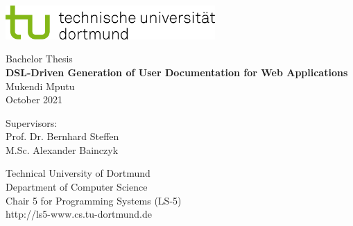 \begin{titlepage}
\vspace*{-2cm}
\newlength{\links}
\setlength{\links}{-1.5cm}
\sffamily
\hspace*{\links}
\begin{minipage}{12.5cm}
\includegraphics[width=8cm]{bilder/tud_logo_rgb}
\end{minipage}

\vspace*{4cm}

\hspace*{\links}
\hspace*{-0.2cm}
\begin{minipage}{9cm}
\large
\begin{center}
{\Large Bachelor Thesis} \\
\vspace*{1cm}
\textbf{DSL-Driven Generation of User Documentation for Web Applications} \\
\vspace*{1cm}
Mukendi Mputu\\
October 2021
\end{center}
\end{minipage}
\normalsize
\vspace*{5.5cm}


\vspace*{2.1cm}

\hspace*{\links}
\begin{minipage}[b]{5cm}
\raggedright
Supervisors:\\
Prof. Dr. Bernhard Steffen\\
M.Sc. Alexander Bainczyk\\
\end{minipage}

\vspace*{2.5cm}
\hspace*{\links}
\begin{minipage}[b]{8cm}
\raggedright
Technical University of Dortmund \\
Department of Computer Science\\
Chair 5 for Programming Systems (LS-5)\\
http://ls5-www.cs.tu-dortmund.de
\end{minipage}

\end{titlepage}
